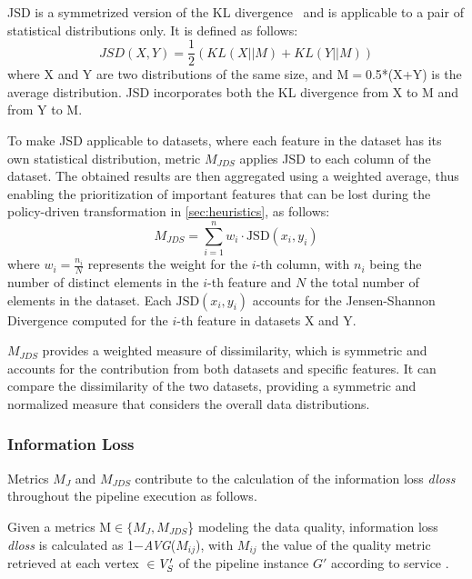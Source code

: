 JSD is a symmetrized version of the KL divergence~\cite{Fuglede} and is applicable to a pair of statistical distributions only. It is defined as follows:
\[JSD(X, Y) = \frac{1}{2} \left( KL(X || M)
  + KL(Y || M) \right)\]
%
where X and Y are two distributions of the same size, and M$=$0.5*(X+Y) is the average distribution.
JSD incorporates both the KL divergence from X to M and from Y to M.

To make JSD applicable to datasets, where each feature in the dataset has its own statistical distribution, metric $M_{JDS}$ applies JSD to each column of the dataset. The obtained results are then aggregated using a weighted average, thus enabling the prioritization of important features that can be lost during the policy-driven transformation in \cref{sec:heuristics}, as follows: \[M_{JDS} = \sum_{i=1}^n w_i \cdot \text{JSD}(x_i,y_i)\]
where \(w_i = \frac{n_i}{N}\) represents the weight for the \(i\)-th column, with \(n_i\) being the number of distinct elements in the $i$-th feature and \(N\) the total number of elements in the dataset. Each \(\text{JSD}(x_i,y_i)\) accounts for the Jensen-Shannon Divergence computed for the \(i\)-th feature in datasets X and Y.

$M_{JDS}$ provides a weighted measure of dissimilarity, which is symmetric and accounts for the contribution from both datasets and specific features. It can compare the dissimilarity of the two datasets, providing a symmetric and normalized measure that considers the overall data distributions.


\subsubsection{Information Loss}

Metrics $M_J$ and $M_{JDS}$ contribute to the calculation of the information loss \textit{dloss} throughout the pipeline execution as follows. %

\begin{definition}
  Given a metrics M$\in$$\{M_J,M_{JDS}$\} modeling the data quality, information loss \textit{dloss} is calculated as 1$-$\emph{AVG}($M_{ij}$), with $M_{ij}$ the value of the quality metric retrieved at each vertex $\in$$V'_S$ of the pipeline instance $G'$ according to service .
\end{definition}

